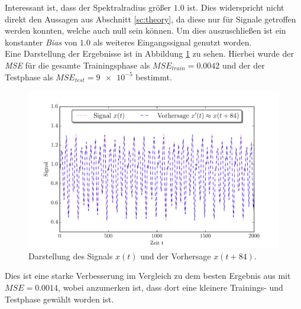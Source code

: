 Interessant ist, dass der Spektralradius größer $1.0$ ist. Dies widerspricht nicht direkt den Aussagen aus Abschnitt \ref{sc:theory}, da diese nur für Signale getroffen werden konnten, welche auch null sein können. Um dies auszuschließen ist ein konstanter \textit{Bias} von $1.0$ als weiteres Eingangssignal genutzt worden.\\
Eine Darstellung der Ergebnisse ist in Abbildung \ref{fig:application_mackeyglass} zu sehen. Hierbei wurde der \textit{MSE} für die gesamte Trainingsphase als $MSE_{train} = 0.0042$ und der der Testphase als $MSE_{test} = \num{9e-5}$ bestimmt.

\begin{figure}[H]
    \centering
    \includegraphics[width = 0.9 \textwidth]{figures/mackeyglass_pred.pdf}
    \caption{Darstellung des Signals $x(t)$ und der Vorhersage $x(t+84)$.}
    \label{fig:application_mackeyglass}
\end{figure}

Dies ist eine starke Verbesserung im Vergleich zu dem besten Ergebnis aus \citep{caraballo2014} mit $MSE = 0.0014$, wobei anzumerken ist, dass dort eine kleinere Trainings- und Testphase gewählt worden ist.